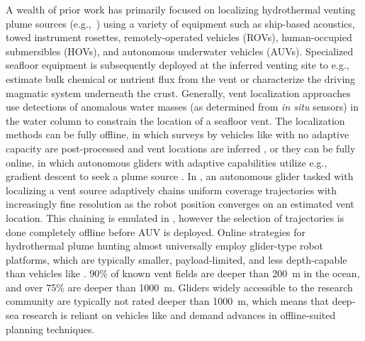 A wealth of prior work has primarily focused on localizing hydrothermal venting plume sources (e.g.,~\cite{jakuba2007stochastic, mcgill2011robot, nakamura2013discovery, paduan2018discovery, mason2020evaluation, wang20203, kim2020discovery,ferri2010novel}) using a variety of equipment such as ship-based acoustics, towed instrument rosettes, remotely-operated vehicles (ROVs), human-occupied submersibles (HOVs), and autonomous underwater vehicles (AUVs). Specialized seafloor equipment is subsequently deployed at the inferred venting site to e.g., estimate bulk chemical or nutrient flux from the vent or characterize the driving magmatic system underneath the crust. Generally, vent localization approaches use detections of anomalous water masses (as determined from \emph{in situ} sensors) in the water column to constrain the location of a seafloor vent. The localization methods can be fully offline, in which surveys by vehicles like \Sentry with no adaptive capacity are post-processed and vent locations are inferred \autocite{jakuba2007stochastic,nakamura2013discovery}, or they can be fully online, in which autonomous gliders with adaptive capabilities utilize e.g., gradient descent to seek a plume source \autocite{wang20203}. In \autocite{branch2020demonstration}, an autonomous glider tasked with localizing a vent source adaptively chains uniform coverage trajectories with increasingly fine resolution as the robot position converges on an estimated vent location. This chaining is emulated in \PHORTEX, however the selection of trajectories is done completely offline before AUV \Sentry is deployed. Online strategies for hydrothermal plume hunting almost universally employ glider-type robot platforms, which are typically smaller, payload-limited, and less depth-capable than vehicles like \Sentry. 90\% of known vent fields are deeper than \SI{200}{\meter} in the ocean, and over 75\% are deeper than \SI{1000}{\meter}\autocite{beaulieu2013authoritative}. Gliders widely accessible to the research community are typically not rated deeper than \SI{1000}{\meter}, which means that deep-sea research is reliant on vehicles like \Sentry and demand advances in offline-suited planning techniques.

